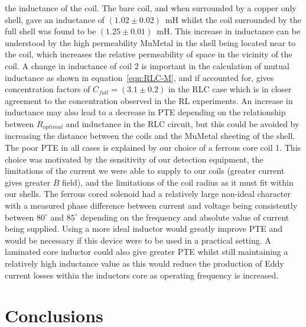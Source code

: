 \documentclass[11pt]{iopart}
\begin{document}
the inductance of the coil. The bare coil, and when surrounded by a
copper only shell, gave an inductance of $(1.02\pm0.02)$~mH whilst the
coil surrounded by the full shell was found to be $(1.25\pm0.01)$~mH.
This increase in inductance can be understood by the high permeability
MuMetal in the shell being located near to the coil, which increases
the relative permeability of space in the vicinity of the coil. A
change in inductance of coil 2 is important in the calculation of
mutual inductance as shown in equation~\ref{eqn:RLC-M}, and if
accounted for, gives concentration factors of $C_{full}=(3.1\pm0.2)$ in
the RLC case which is in closer agreement to the concentration
observed in the RL experiments. An increase in inductance may also
lead to a decrease in PTE depending on the relationship between
$R_{optimal}$ and inductance in the RLC circuit, but this could be
avoided by increasing the distance between the coils and the MuMetal
sheeting of the shell.\\
The poor PTE in all cases is explained by our choice of a ferrous
core coil 1. This choice was motivated by the sensitivity of our
detection equipment, the limitations of the current we were able to
supply to our coils (greater current gives greater $B$ field), and the
limitations of the coil radius as it must fit within our shells. The
ferrous cored solenoid had a relatively large non-ideal character with
a measured phase difference between current and voltage being
consistently between $80^\circ$ and $85^\circ$ depending on the
frequency and absolute value of current being supplied. Using a more
ideal inductor would greatly improve PTE and would be necessary if
this device were to be used in a practical setting. A laminated core
inductor could also give greater PTE whilst still maintaining a
relatively high inductance value as this would reduce the production
of Eddy current losses within the inductors core as operating
frequency is increased. \\

\section{Conclusions}
\end{document}
